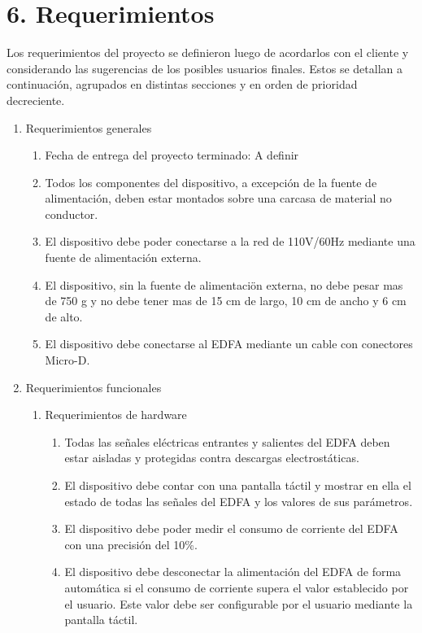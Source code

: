 \documentclass[
11pt, %
codirector, %
]{charter}
\begin{document}
\section{6. Requerimientos}
\label{sec:requerimientos}

Los requerimientos del proyecto se definieron luego de acordarlos con el cliente y considerando las sugerencias de los posibles usuarios finales. Estos se detallan a continuación, agrupados en distintas secciones y en orden de prioridad decreciente.

\begin{enumerate}
	\item Requerimientos generales
		\begin{enumerate}
			\item Fecha de entrega del proyecto terminado: A definir
			\item Todos los componentes del dispositivo, a excepción de la fuente de alimentación, deben estar montados sobre una carcasa de material no conductor.
			\item El dispositivo debe poder conectarse a la red de 110V/60Hz mediante una fuente de alimentación externa.
			\item El dispositivo, sin la fuente de alimentaciön externa, no debe pesar mas de 750 g y no debe tener mas de 15 cm de largo, 10 cm de ancho y 6 cm de alto.
			\item El dispositivo debe conectarse al EDFA mediante un cable con conectores Micro-D.
		\end{enumerate}
	\item Requerimientos funcionales
		\begin{enumerate}
			\item Requerimientos de hardware
				\begin{enumerate}[label*=\arabic*.]
					\item Todas las señales eléctricas entrantes y salientes del EDFA deben estar aisladas y protegidas contra descargas electrostáticas.
					\item El dispositivo debe contar con una pantalla táctil y mostrar en ella el estado de todas las señales del EDFA y los valores de sus parámetros.
					\item El dispositivo debe poder medir el consumo de corriente del EDFA con una precisión del 10\%.
					\item El dispositivo debe desconectar la alimentación del EDFA de forma automática si el consumo de corriente supera el valor establecido por el usuario. Este valor debe ser configurable por el usuario mediante la pantalla táctil.

\end{enumerate}
\end{enumerate}
\end{enumerate}
\end{document}
